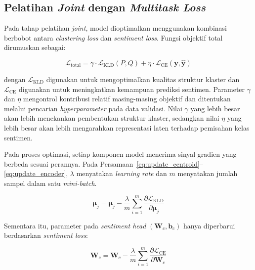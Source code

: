 \subsection{Pelatihan \textit{Joint} dengan \textit{Multitask Loss}}

Pada tahap pelatihan \textit{joint}, model dioptimalkan menggunakan kombinasi berbobot antara \textit{clustering loss} dan \textit{sentiment loss}. Fungsi objektif total dirumuskan sebagai:

\begin{equation}
    \mathcal{L}_{\text{total}}
    =
    \gamma \cdot \mathcal{L}_{\text{KLD}}(P,Q)
    +
    \eta \cdot \mathcal{L}_{\text{CE}}(\mathbf{y},\hat{\mathbf{y}})
    \label{eq:total_loss}
\end{equation}

\noindent dengan $\mathcal{L}_{\text{KLD}}$ digunakan untuk mengoptimalkan kualitas struktur klaster dan $\mathcal{L}_{\text{CE}}$ digunakan untuk meningkatkan kemampuan prediksi sentimen. Parameter $\gamma$ dan $\eta$ mengontrol kontribusi relatif masing-masing objektif dan ditentukan melalui pencarian \textit{hyperparameter} pada data validasi. Nilai $\gamma$ yang lebih besar akan lebih menekankan pembentukan struktur klaster, sedangkan nilai $\eta$ yang lebih besar akan lebih mengarahkan representasi laten terhadap pemisahan kelas sentimen.

Pada proses optimasi, setiap komponen model menerima sinyal gradien yang berbeda sesuai perannya. 
Pada Persamaan~\ref{eq:update_centroid}--\ref{eq:update_encoder}, $\lambda$ menyatakan \textit{learning rate} 
dan $m$ menyatakan jumlah sampel dalam satu \textit{mini-batch}.


\begin{equation}
    \boldsymbol{\mu}_j
    =
    \boldsymbol{\mu}_j
    -
    \frac{\lambda}{m}
    \sum_{i=1}^{m}
    \frac{\partial \mathcal{L}_{\text{KLD}}}{\partial \boldsymbol{\mu}_j}
    \label{eq:update_centroid}
\end{equation}

\noindent Sementara itu, parameter pada \textit{sentiment head}
$(\mathbf{W}_c, \mathbf{b}_c)$ hanya diperbarui berdasarkan
\textit{sentiment loss}:

\begin{equation}
    \mathbf{W}_c
    =
    \mathbf{W}_c
    -
    \frac{\lambda}{m}
    \sum_{i=1}^{m}
    \frac{\partial \mathcal{L}_{\text{CE}}}{\partial \mathbf{W}_c}
    \label{eq:update_sentiment}
\end{equation}

